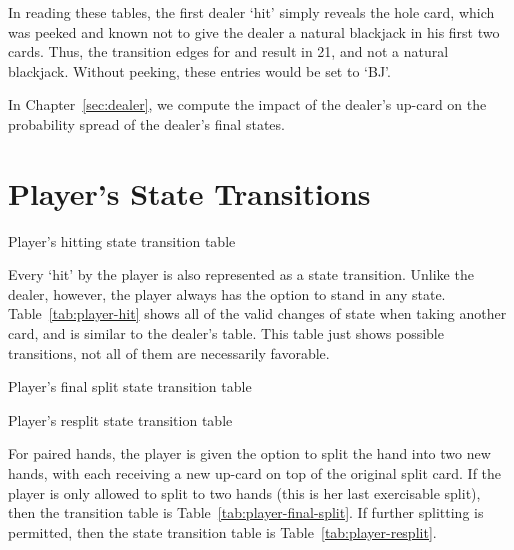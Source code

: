 In reading these tables, 
the first dealer `hit' simply reveals the hole card, 
which was peeked and known not to give the 
dealer a natural blackjack in his first two cards.
Thus, the transition edges for 
and  result in 21, and not a natural blackjack.
Without peeking, these entries would be set to `BJ'.

\begin{comment}
Proper analysis begins by evaluating the probability distribution
of the dealer's terminal states given the dealer's up-card. 
Since the dealer's actions are entirely independent of 
the players' actions, we can define the state-machine
for the dealer's cards, following the rule that the dealer
must hit until his total exceeds 16.
\end{comment}

In Chapter~\ref{sec:dealer}, 
we compute the impact of the dealer's up-card 
on the probability spread of the dealer's final states.

\section{Player's State Transitions}
\label{sec:rules:player-hit}

\begin{table}[ht!]
\caption{Player's hitting state transition table}
\begin{center}

\end{center}
\label{tab:player-hit}
\end{table}

Every `hit' by the player is also represented as a state transition.
Unlike the dealer, however, the player always has the option
to stand in any state.
Table~\ref{tab:player-hit} shows all of the valid changes of state
when taking another card, and is similar to the dealer's table.
This table just shows possible transitions, 
not all of them are necessarily favorable.

\begin{table}[ht!]
\caption{Player's final split state transition table}
\begin{center}

\end{center}
\label{tab:player-final-split}
\end{table}

\begin{table}[ht!]
\caption{Player's resplit state transition table}
\begin{center}

\end{center}
\label{tab:player-resplit}
\end{table}

For paired hands, the player is given the option to split the
hand into two new hands, with each receiving a new up-card on top
of the original split card.
If the player is only allowed to split to two hands
(this is her last exercisable split), 
then the transition table is Table~\ref{tab:player-final-split}.
If further splitting is permitted, then the state transition table
is Table~\ref{tab:player-resplit}.

